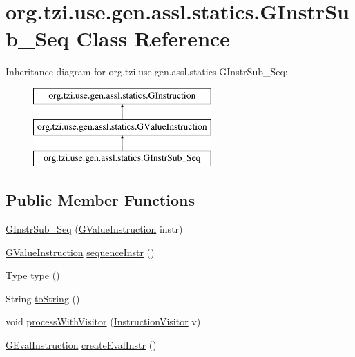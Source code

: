 \hypertarget{classorg_1_1tzi_1_1use_1_1gen_1_1assl_1_1statics_1_1_g_instr_sub___seq}{\section{org.\-tzi.\-use.\-gen.\-assl.\-statics.\-G\-Instr\-Sub\-\_\-\-Seq Class Reference}
\label{classorg_1_1tzi_1_1use_1_1gen_1_1assl_1_1statics_1_1_g_instr_sub___seq}
}
Inheritance diagram for org.\-tzi.\-use.\-gen.\-assl.\-statics.\-G\-Instr\-Sub\-\_\-\-Seq\-:\begin{figure}[H]
\begin{center}
\leavevmode
\includegraphics[height=3.000000cm]{classorg_1_1tzi_1_1use_1_1gen_1_1assl_1_1statics_1_1_g_instr_sub___seq}
\end{center}
\end{figure}
\subsection*{Public Member Functions}
\begin{DoxyCompactItemize}
\item 
\hyperlink{classorg_1_1tzi_1_1use_1_1gen_1_1assl_1_1statics_1_1_g_instr_sub___seq_a4c8d7935692270d5627f2ed82e043b7d}{G\-Instr\-Sub\-\_\-\-Seq} (\hyperlink{interfaceorg_1_1tzi_1_1use_1_1gen_1_1assl_1_1statics_1_1_g_value_instruction}{G\-Value\-Instruction} instr)
\item 
\hyperlink{interfaceorg_1_1tzi_1_1use_1_1gen_1_1assl_1_1statics_1_1_g_value_instruction}{G\-Value\-Instruction} \hyperlink{classorg_1_1tzi_1_1use_1_1gen_1_1assl_1_1statics_1_1_g_instr_sub___seq_a55929fdb49775d7df0b180a2c3f6f575}{sequence\-Instr} ()
\item 
\hyperlink{interfaceorg_1_1tzi_1_1use_1_1uml_1_1ocl_1_1type_1_1_type}{Type} \hyperlink{classorg_1_1tzi_1_1use_1_1gen_1_1assl_1_1statics_1_1_g_instr_sub___seq_a54ddf5644a7af07f0ebea932945e7936}{type} ()
\item 
String \hyperlink{classorg_1_1tzi_1_1use_1_1gen_1_1assl_1_1statics_1_1_g_instr_sub___seq_a5cb18f76cbcc5244b0a3336ece22f8fb}{to\-String} ()
\item 
void \hyperlink{classorg_1_1tzi_1_1use_1_1gen_1_1assl_1_1statics_1_1_g_instr_sub___seq_a580de12d44ca1527add393b9e81cab4a}{process\-With\-Visitor} (\hyperlink{interfaceorg_1_1tzi_1_1use_1_1gen_1_1assl_1_1statics_1_1_instruction_visitor}{Instruction\-Visitor} v)
\item 
\hyperlink{classorg_1_1tzi_1_1use_1_1gen_1_1assl_1_1dynamics_1_1_g_eval_instruction}{G\-Eval\-Instruction} \hyperlink{classorg_1_1tzi_1_1use_1_1gen_1_1assl_1_1statics_1_1_g_instr_sub___seq_ac67fa1b971e0192ffeb0d242ef6bb232}{create\-Eval\-Instr} ()
\end{DoxyCompactItemize}


